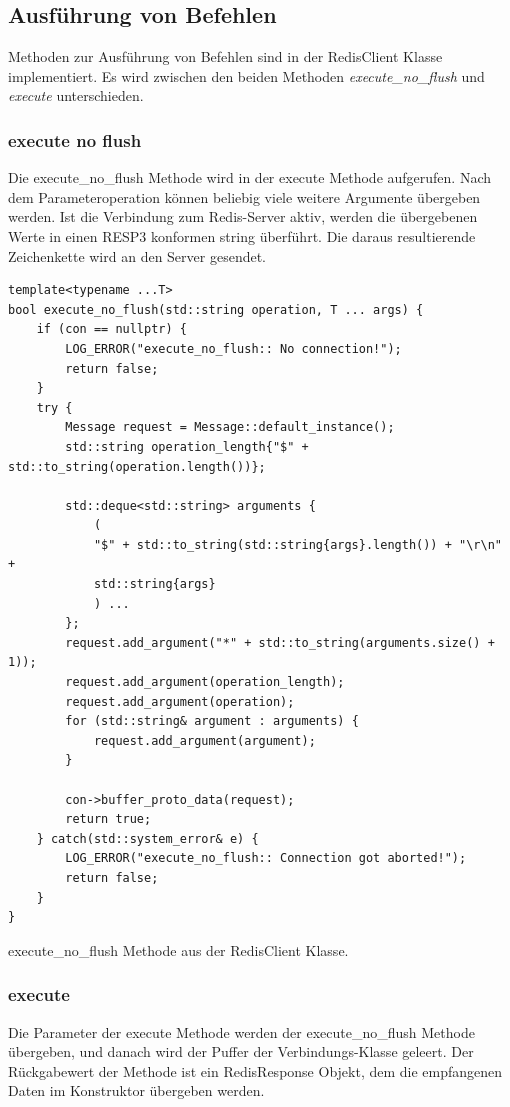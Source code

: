 \documentclass[12pt, letterpaper]{article}
\newenvironment{code}{\captionsetup{type=listing}}{}
\begin{document}
\subsection{Ausführung von Befehlen}
Methoden zur Ausführung von Befehlen sind in der RedisClient Klasse implementiert. Es wird zwischen den beiden Methoden \textit{execute\_no\_flush} und \textit{execute} unterschieden.
\subsubsection{execute no flush}
Die execute\_no\_flush Methode wird in der execute Methode aufgerufen. Nach dem Parameteroperation können beliebig viele weitere Argumente übergeben werden. Ist die Verbindung zum Redis-Server aktiv, werden die übergebenen Werte in einen RESP3 konformen string überführt. Die daraus resultierende Zeichenkette wird an den Server gesendet.

\begin{code}
\begin{verbatim}
template<typename ...T>
bool execute_no_flush(std::string operation, T ... args) {
    if (con == nullptr) {
        LOG_ERROR("execute_no_flush:: No connection!");
        return false;
    } 
    try {
        Message request = Message::default_instance();
        std::string operation_length{"$" + std::to_string(operation.length())};
    
        std::deque<std::string> arguments {
            (
            "$" + std::to_string(std::string{args}.length()) + "\r\n" + 
            std::string{args}
            ) ...
        };
        request.add_argument("*" + std::to_string(arguments.size() + 1));
        request.add_argument(operation_length);
        request.add_argument(operation);
        for (std::string& argument : arguments) {
            request.add_argument(argument);
        }

        con->buffer_proto_data(request);
        return true;
    } catch(std::system_error& e) {
        LOG_ERROR("execute_no_flush:: Connection got aborted!");
        return false;
    }
}

\end{verbatim}
\caption{execute\_no\_flush Methode aus der RedisClient Klasse.}
\label{resolve_domain}
\end{code}

\subsubsection{execute}
Die Parameter der execute Methode werden der execute\_no\_flush Methode übergeben, und danach wird der Puffer der Verbindungs-Klasse geleert.
Der Rückgabewert der Methode ist ein RedisResponse Objekt, dem die empfangenen Daten im Konstruktor übergeben werden.
\end{document}

